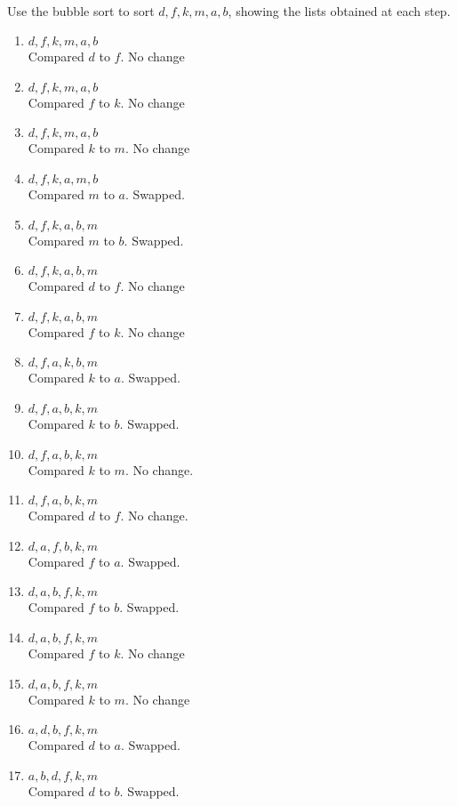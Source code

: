 \documentclass[12pt]{article}  %
\begin{document}
\\
Use the bubble sort to sort $d,f,k,m,a,b$, showing the lists obtained at each step.
\begin{enumerate}
    \item $d,f,k,m,a,b$\\
    Compared $d$ to $f$. No change
    \item $d,f,k,m,a,b$\\
    Compared $f$ to $k$. No change
    \item $d,f,k,m,a,b$\\
    Compared $k$ to $m$. No change
    \item $d,f,k,a,m,b$\\
    Compared $m$ to $a$. Swapped.
    \item $d,f,k,a,b,m$\\
    Compared $m$ to $b$. Swapped.
    \item $d,f,k,a,b,m$\\
    Compared $d$ to $f$. No change
    \item $d,f,k,a,b,m$\\
    Compared $f$ to $k$. No change
    \item $d,f,a,k,b,m$\\
    Compared $k$ to $a$. Swapped.
    \item $d,f,a,b,k,m$\\
    Compared $k$ to $b$. Swapped.
    \item $d,f,a,b,k,m$\\
    Compared $k$ to $m$. No change.
    \item $d,f,a,b,k,m$\\
    Compared $d$ to $f$. No change.
    \item $d,a,f,b,k,m$\\
    Compared $f$ to $a$. Swapped.
    \item $d,a,b,f,k,m$\\
    Compared $f$ to $b$. Swapped.
    \item $d,a,b,f,k,m$\\
    Compared $f$ to $k$. No change
    \item $d,a,b,f,k,m$\\
    Compared $k$ to $m$. No change
    \item $a,d,b,f,k,m$\\
    Compared $d$ to $a$. Swapped.
    \item $a,b,d,f,k,m$\\
    Compared $d$ to $b$. Swapped.

\end{enumerate}
\end{document}

